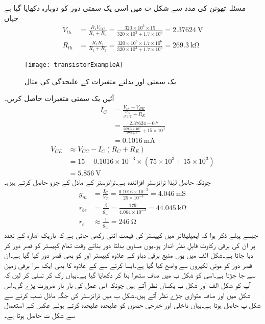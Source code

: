 مسئلہ تھونن کی مدد سے شکل  ت میں اسی یک سمتی دور کو دوبارہ دکھایا گیا ہے جہاں
\begin{align*}
V_{th}&=\frac{R_1 V_{CC}}{R_1+R_2}=\frac{320 \times 10^{3} \times 15}{320\times 10^{3}+1.7 \times 10^{6}}=\SI{2.37624}{\volt}\\
R_{th}&=\frac{R_1 R_2}{R_1+R_2}=\frac{320 \times 10^{3} \times 1.7 \times 10^{6}}{320 \times 10^{3}+1.7 \times 10^{6}}=\SI{269.3}{\kilo \ohm}
\end{align*}
%
\begin{figure}
\centering
\texttt{[image: transistorExampleA]}
\caption{یک سمتی اور بدلتے متغیرات کے علیحدگی کی مثال}
\label{شکل_مثال_کا_دور_الف}
\end{figure}
آئیں یک سمتی متغیرات حاصل کریں۔
\begin{align*}
I_C&=\frac{V_{th}-V_{BE}}{\frac{R_{th}}{\beta+1}+R_E}\\
&=\frac{2.37624-0.7}{\frac{269.3 \times 10^{3}}{179+1}+15\times 10^{3}}\\
&=\SI{0.1016}{ \milli \ampere}
\end{align*}
%
\begin{align*}
V_{CE} &\approx V_{CC}-I_C \left(R_C+R_E \right )\\
&=15-0.1016 \times 10^{-3} \times \left(75 \times 10^{3}+15 \times 10^{3} \right )\\
&=\SI{5.856}{\volt}
\end{align*}
چونکہ حاصل   لہٰذا ٹرانزسٹر افزائندہ ہے۔ٹرانزسٹر کے   ماڈل کے جزو حاصل کرتے ہیں۔
\begin{align*}
g_m &=\frac{I_C}{V_T} =\frac{0.1016 \times 10^{-3}}{25 \times 10^{-3}}=\SI{4.046}{\milli \siemens}\\
r_{be}&=\frac{\beta}{g_m}=\frac{179}{4.064 \times 10^{-3}} =\SI{44.045}{\kilo \ohm}\\
r_e & \approx \frac{1}{g_m}=\SI{246}{\ohm}
\end{align*}
جیسے پہلے ذکر ہوا کہ ایمپلیفائر میں کپیسٹر کی قیمت اتنی رکھی جاتی ہے کہ باریک اشارہ کے تعدد پر ان کی برقی رکاوٹ  قابلِ نظر انداز ہو۔یوں مساوی بدلتا دور بناتے وقت تمام کپیسٹر کو قصر دور کر دیا جاتا ہے۔شکل  الف میں یوں منبع برقی دباو  کے علاوہ کپیسٹر   اور  کو بھی قصر دور کیا گیا ہے۔ان قصر دور کو موٹی لکیروں سے واضح کیا گیا ہے۔ایسا کرنے سے  کے علاوہ  کا بھی ایک سرا برقی زمین سے جا جڑتا ہے۔اسی کو شکل  ب میں صاف ستھرا بنا کر دکھایا گیا ہے۔یہاں رک کر تسلی کر لیں کہ آپ کو شکل  الف   اور شکل  ب یکساں نظر آتے ہیں چونکہ اس عمل کی بار بار ضرورت پڑے گی۔اس شکل میں   اور   صاف متوازی جڑے نظر آتے ہیں۔شکل  ب میں ٹرانزسٹر کی جگہ    ماڈل نسب کرنے سے شکل  پ حاصل ہوتا ہے۔یہاں داخلی اور خارجی حصوں کو علیحدہ علیحدہ کرتے ہوئے عکس  کے استعمال سے شکل  ت حاصل ہوتا ہے۔

